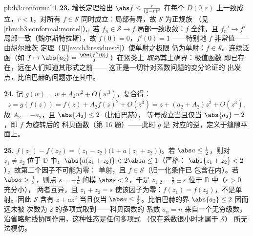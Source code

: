 \begin{solution}{pb:b3:conformal:1}
\textbf{23.} 增长定理给出 $\abs f \leq
\frac{r}{(1-r)^2}$ 在每个 $\bar D(0, r)$ 上一致成立，$r <
1$，对所有 $f \in \mathcal S$ 同时成立：局部有界，故
$\mathcal S$ 为正规族
（见\cref{thm:b3:conformal:montel}）。若 $f_n \in \mathcal S \to
f$ 局部一致收敛：$f$ 全纯，且 $f_n' \to f'$
局部一致（魏尔斯特拉斯），故 $f(0) = 0$，$f'(0) = 1$
——特别地 $f$ 非常值——由胡尔维茨
定理（见\cref{exo:b3:residues:8}）使单射之极限
仍为单射：$f \in \mathcal S$。连续泛函（如
$f \mapsto \abs{a_2} = \frac{\abs{f''(0)}}2$）在紧类上
\emph{取到}其上确界：极值函数
即已存在，远在人们知道其形式之前——
这正是一切针对系数问题的变分论证的
出发点，比伯巴赫的问题亦在其中。

\textbf{24.} 记 $g(w) = w + A_2w^2 + O(w^3)$，复合得：
\[
z = g(f(z)) = f(z) + A_2f(z)^2 + O(z^3)
= z + (a_2 + A_2)z^2 + O(z^3),
\]
故 $A_2 = -a_2$，且 $\abs{A_2} \leq 2$（比伯巴赫），
等号成立当且仅当 $\abs{a_2} = 2$，即 $f$ 为旋转后的
科贝函数（第 16 题）——此时 $g$ 是
对应的逆，定义于缝隙平面上。

\textbf{25.} $f(z_1) - f(z_2) = (z_1 - z_2)\bigl(1 + a(z_1 +
z_2)\bigr)$。若 $\abs a \leq \frac12$，则对 $z_1 \neq z_2$ 位于
$\mathbb D$ 中，$\abs{a(z_1 + z_2)} < 2\abs a \leq 1$（严格：
$\abs{z_1 + z_2} < 2$），故第二个因子不可能为零：
单射，且 $f \in \mathcal S$（归一化条件已
包含在内）。若 $\abs a > \frac12$，则点 $s =
-\frac1a$ 的模 $\abs s < 2$，于是 $z_{1,2} = \frac s2 \pm
\varepsilon$ 位于 $\mathbb D$ 中（$\varepsilon > 0$ 充分小），
两者互异，且 $z_1 + z_2 = s$ 使该因子为零：$f(z_1)
= f(z_2)$，不是单射。因此 $\mathcal S$ 含有 $z +
az^2$ 当且仅当 $\abs a \leq \frac12$。比伯巴赫的界
$\abs{a_2} \leq 2$ 因而远未被
次数为 $2$ 的多项式取到——科贝函数的
系数 $a_n = n$ 来自一个无穷级数，
沿省略射线协同作用，这种性态是任何多项式
（仅在系数很小时才属于 $\mathcal S$）
所无法模仿。
\end{solution}
